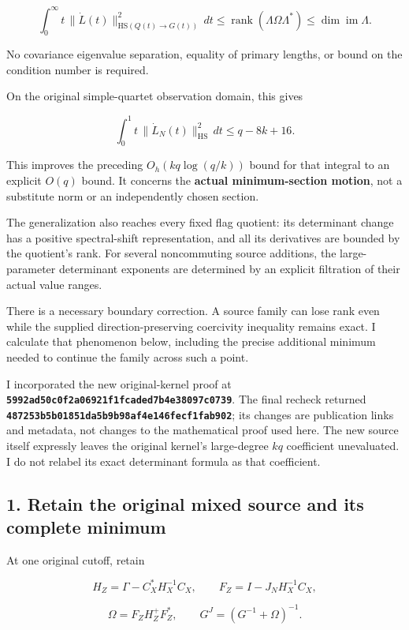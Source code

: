 \documentclass[11pt]{article}
\begin{document}
\[
\boxed{
\int_0^\infty t\,\|\dot L(t)\|_{\mathrm{HS}(Q(t)\to G(t))}^{2}\,dt
\le \operatorname{rank}(\Lambda\Omega\Lambda^*)
\le \dim\operatorname{im}\Lambda.
}
\tag{1}
\]

No covariance eigenvalue separation, equality of primary lengths, or bound on the condition number is required.

On the original simple-quartet observation domain, this gives

\[
\boxed{
\int_0^1t\,\|\dot L_N(t)\|_{\mathrm{HS}}^2\,dt
\le q-8k+16.
}
\tag{2}
\]

This improves the preceding \(O_h(kq\log(q/k))\) bound for that integral to an explicit \(O(q)\) bound. It concerns the \textbf{actual minimum-section motion}, not a substitute norm or an independently chosen section.

The generalization also reaches every fixed flag quotient: its determinant change has a positive spectral-shift representation, and all its derivatives are bounded by the quotient's rank. For several noncommuting source additions, the large-parameter determinant exponents are determined by an explicit filtration of their actual value ranges.

There is a necessary boundary correction. A source family can lose rank even while the supplied direction-preserving coercivity inequality remains exact. I calculate that phenomenon below, including the precise additional minimum needed to continue the family across such a point.

I incorporated the new original-kernel proof at \textbf{\nolinkurl{5992ad50c0f2a06921f1fcaded7b4e38097c0739}}. The final recheck returned \textbf{\nolinkurl{487253b5b01851da5b9b98af4e146fecf1fab902}}; its changes are publication links and metadata, not changes to the mathematical proof used here. The new source itself expressly leaves the original kernel's large-degree \(kq\) coefficient unevaluated. I do not relabel its exact determinant formula as that coefficient.

\subsection{1. Retain the original mixed source and its complete minimum}\label{retain-the-original-mixed-source-and-its-complete-minimum}

At one original cutoff, retain

\[
H_Z=\Gamma-C_X^*H_X^{-1}C_X,\qquad
F_Z=I-J_NH_X^{-1}C_X,
\]

\[
\Omega=F_ZH_Z^+F_Z^*,\qquad
G^J=(G^{-1}+\Omega)^{-1}.
\]
\end{document}
